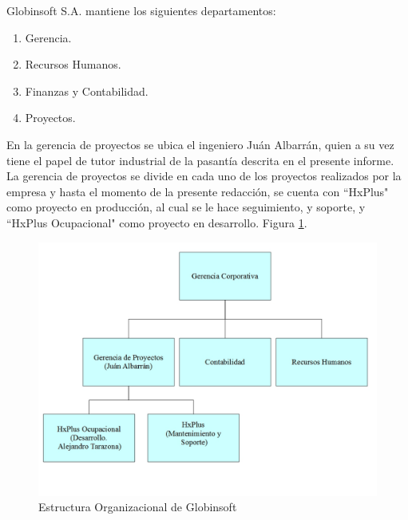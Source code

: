     Globinsoft S.A. mantiene los siguientes departamentos:
    
    \begin{enumerate}
        \item Gerencia.
        \item Recursos Humanos.
        \item Finanzas y Contabilidad.
        \item Proyectos.
    \end{enumerate}
    
    En la gerencia de proyectos se ubica el ingeniero Juán Albarrán, quien a su vez tiene el papel de tutor industrial de la pasantía descrita en el presente informe. La gerencia de proyectos se divide en cada uno de los proyectos realizados por la empresa y hasta el momento de la presente redacción, se cuenta con ``HxPlus" como proyecto en producción, al cual se le hace seguimiento, y soporte, y ``HxPlus Ocupacional" como proyecto en desarrollo. Figura \ref{estructura-org}.
    
    \begin{figure}[htbp!]
        \begin{center}
            \includegraphics[scale=.25]{figures/Estructura}
        \end{center}
        \caption{Estructura Organizacional de Globinsoft}
        \label{estructura-org}
    \end{figure}

\pagebreak